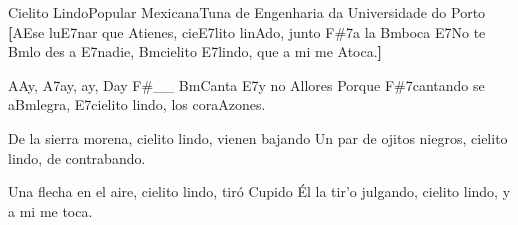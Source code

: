 \begin{musica}{Cielito Lindo}{Popular Mexicana}{Tuna de Engenharia da Universidade do Porto}
\textbf{[}\ac{A}{Ese} lu\ac{E7}{nar} que \ac{A}{tie}nes, cie\ac{E7}{li}to lin\ac{A}{do}, junto \ac{F#7}{a} la \ac{Bm}{bo}ca
\ac{E7}{No} te \ac{Bm}{lo} des a \ac{E7}{na}die, \ac{Bm}{cie}lito \ac{E7}{lin}do, que a mi me \ac{A}{to}ca.\textbf{]} 

\ac{A}{Ay}, \ac{A7}{ay}, ay, \ac{D}{ay} \ac{F#}{}__
\ac{Bm}{Can}ta \ac{E7}{y} no \ac{A}{llo}res
Porque \ac{F#7}{can}tando se a\ac{Bm}{le}gra, \ac{E7}{cie}lito lindo, los cora\ac{A}{zo}nes.

De la sierra morena, cielito lindo, vienen bajando
Un par de ojitos niegros, cielito lindo, de contrabando.

Una flecha en el aire, cielito lindo, tiró Cupido
Él la tir'o julgando, cielito lindo, y a mi me toca.

\end{musica}
